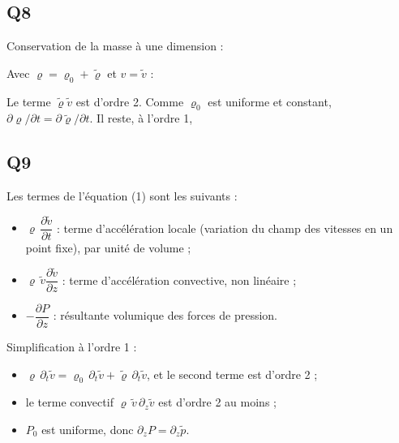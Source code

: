 \documentclass[11pt,a4paper]{article}
\providecommand{\tightlist}{\setlength{\itemsep}{0pt}\setlength{\parskip}{0pt}}
\newcommand{\equationajustee}[1]{%
  \sbox{\boiteequation}{$\displaystyle #1$}%
  \ifdim\wd\boiteequation>\linewidth
    \[\resizebox{\linewidth}{!}{\usebox{\boiteequation}}\]%
  \else
    \[#1\]%
  \fi}
\begin{document}
\hypertarget{q8}{%
\subsection{Q8}\label{q8}}

Conservation de la masse à une dimension :

\equationajustee{\frac{\partial\varrho}{\partial t}+\frac{\partial(\varrho v)}{\partial z}=0.}

Avec \(\varrho=\varrho_0+\tilde\varrho\) et \(v=\tilde v\) :

\equationajustee{\varrho v=\varrho_0\tilde v+\tilde\varrho\tilde v.}

Le terme \(\tilde\varrho\tilde v\) est d'ordre 2. Comme \(\varrho_0\) est uniforme et constant, \(\partial\varrho/\partial t=\partial\tilde\varrho/\partial t\). Il reste, à l'ordre 1,

\equationajustee{\boxed{\frac{\partial\tilde\varrho}{\partial t}+\varrho_0\frac{\partial\tilde v}{\partial z}=0}.}

\hypertarget{q9}{%
\subsection{Q9}\label{q9}}

Les termes de l'équation (1) sont les suivants :

\begin{itemize}
\tightlist
\item
  \(\varrho\,\dfrac{\partial\tilde v}{\partial t}\) : terme d'accélération locale (variation du champ des vitesses en un point fixe), par unité de volume ;
\item
  \(\varrho\,\tilde v\dfrac{\partial\tilde v}{\partial z}\) : terme d'accélération convective, non linéaire ;
\item
  \(-\dfrac{\partial P}{\partial z}\) : résultante volumique des forces de pression.
\end{itemize}

Simplification à l'ordre 1 :

\begin{itemize}
\tightlist
\item
  \(\varrho\,\partial_t\tilde v=\varrho_0\,\partial_t\tilde v+\tilde\varrho\,\partial_t\tilde v\), et le second terme est d'ordre 2 ;
\item
  le terme convectif \(\varrho\,\tilde v\,\partial_z\tilde v\) est d'ordre 2 au moins ;
\item
  \(P_0\) est uniforme, donc \(\partial_zP=\partial_z\tilde p\).
\end{itemize}
\end{document}
